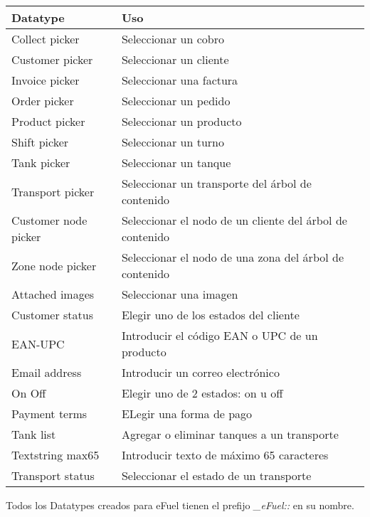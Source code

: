 \begin{center}
    \begin{longtable}{  l | l  }
        \hline\hline
        \rowcolor{gray!30}
        \textbf{Datatype} & \textbf{Uso} \\
        \hline\hline
        \endhead

        \hline
        \endfoot

        Collect picker & Seleccionar un cobro \\
        Customer picker & Seleccionar un cliente \\
        Invoice picker & Seleccionar una factura \\
        Order picker & Seleccionar un pedido \\
        Product picker & Seleccionar un producto \\
        Shift picker & Seleccionar un turno \\
        Tank picker & Seleccionar un tanque \\
        Transport picker & Seleccionar un transporte del árbol de contenido \\
        Customer node picker & Seleccionar el nodo de un cliente del árbol de contenido \\
        Zone node picker & Seleccionar el nodo de una zona del árbol de contenido \\
        Attached images & Seleccionar una imagen \\
        Customer status & Elegir uno de los estados del cliente \\
        EAN-UPC & Introducir el código EAN o UPC de un producto \\
        Email address & Introducir un correo electrónico \\
        On Off & Elegir uno de 2 estados: on u off \\
        Payment terms & ELegir una forma de pago \\
        Tank list & Agregar o eliminar tanques a un transporte \\
        Textstring max65 & Introducir texto de máximo 65 caracteres \\
        Transport status & Seleccionar el estado de un transporte \\

        \hline
    \end{longtable}
\end{center}

Todos los Datatypes creados para eFuel tienen el prefijo \emph{\_eFuel::} en su nombre.

